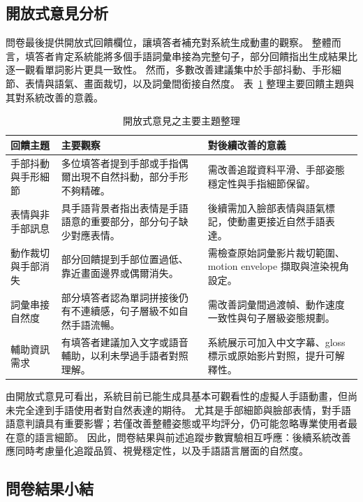 \documentclass[class=NCU_thesis, crop=false]{standalone}
\begin{document}
\subsection{開放式意見分析}

問卷最後提供開放式回饋欄位，讓填答者補充對系統生成動畫的觀察。
整體而言，填答者肯定系統能將多個手語詞彙串接為完整句子，部分回饋指出生成結果比逐一觀看單詞影片更具一致性。
然而，多數改善建議集中於手部抖動、手形細節、表情與語氣、畫面裁切，以及詞彙間銜接自然度。
表~\ref{tab:questionnaire_open_feedback_themes} 整理主要回饋主題與其對系統改善的意義。

\begin{table}[H]
\centering
\caption{開放式意見之主要主題整理}
\label{tab:questionnaire_open_feedback_themes}
\small
\begin{tabular}{p{}p{}p{}}
\toprule
回饋主題 & 主要觀察 & 對後續改善的意義 \\
\midrule
手部抖動與手形細節 & 多位填答者提到手部或手指偶爾出現不自然抖動，部分手形不夠精確。 & 需改善追蹤資料平滑、手部姿態穩定性與手指細節保留。 \\
表情與非手部訊息 & 具手語背景者指出表情是手語語意的重要部分，部分句子缺少對應表情。 & 後續需加入臉部表情與語氣標記，使動畫更接近自然手語表達。 \\
動作裁切與手部消失 & 部分回饋提到手部位置過低、靠近畫面邊界或偶爾消失。 & 需檢查原始詞彙影片裁切範圍、motion envelope 擷取與渲染視角設定。 \\
詞彙串接自然度 & 部分填答者認為單詞拼接後仍有不連續感，句子層級不如自然手語流暢。 & 需改善詞彙間過渡幀、動作速度一致性與句子層級姿態規劃。 \\
輔助資訊需求 & 有填答者建議加入文字或語音輔助，以利未學過手語者對照理解。 & 系統展示可加入中文字幕、gloss 標示或原始影片對照，提升可解釋性。 \\
\bottomrule
\end{tabular}
\end{table}

由開放式意見可看出，系統目前已能生成具基本可觀看性的虛擬人手語動畫，但尚未完全達到手語使用者對自然表達的期待。
尤其是手部細節與臉部表情，對手語語意判讀具有重要影響；若僅改善整體姿態或平均評分，仍可能忽略專業使用者最在意的語言細節。
因此，問卷結果與前述追蹤步數實驗相互呼應：後續系統改善應同時考慮量化追蹤品質、視覺穩定性，以及手語語言層面的自然度。

\subsection{問卷結果小結}
\end{document}
